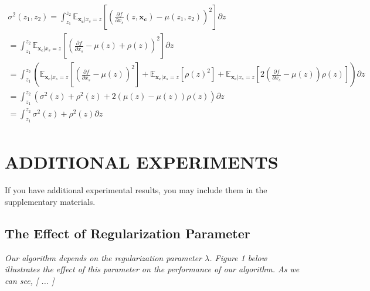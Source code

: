 \documentclass[twoside]{article}
\newcommand{\xc}{\mathbf{x_c}}
\begin{document}
\begin{gather}
  \sigma^2(z_1, z_2) = \int_{z_1}^{z_2} \mathbb{E}_{\xc|x_s=z} \left [ \left( \frac{\partial f}{\partial x_s}( z, \xc) - \mu(z_1, z_2) \right)^2 \right] \partial z \\
  = \int_{z_1}^{z_2} \mathbb{E}_{\xc|x_s=z} \left [ \left ( \frac{\partial f}{\partial x_s} - \mu(z) + \rho(z) \right )^2 \right] \partial z \\
  = \int_{z_1}^{z_2} \left(
  \mathbb{E}_{\xc|x_s=z} \left [ (\frac{\partial f}{\partial x_s} - \mu(z) )^2 \right ]  +
  \mathbb{E}_{\xc|x_s=z} \left [ \rho(z)^2 \right] +
  \mathbb{E}_{\xc|x_s=z} \left [ 2(\frac{\partial f}{\partial x_s} - \mu(z) )\rho(z) \right ] \right )  \partial z \\
  = \int_{z_1}^{z_2}(\sigma^2(z) + \rho^2(z) + 2(\mu(z)-\mu(z))\rho(z))\partial z \\
  = \int_{z_1}^{z_2} \sigma^2(z)  + \rho^2(z) \partial z \\
\end{gather}


\section{ADDITIONAL EXPERIMENTS}

If you have additional experimental results, you may include them in the supplementary materials.

\subsection{The Effect of Regularization Parameter}

\textit{Our algorithm depends on the regularization parameter $\lambda$. Figure 1 below illustrates the effect of this parameter on the performance of our algorithm. As we can see, [ ... ]}

\vfill
\end{document}
